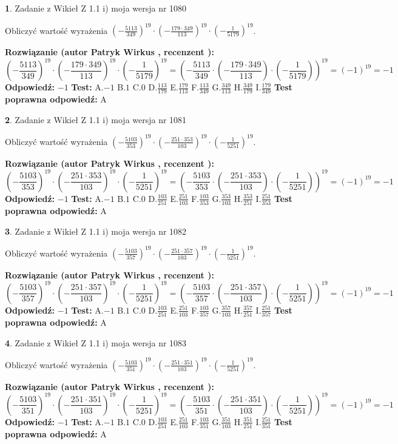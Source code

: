 \documentclass[12pt, a4paper]{article}
\theoremstyle{definition} %
\newtheorem{zad}{}
\newcommand{\zadStart}[1]{\begin{zad}#1\newline}
\newcommand{\zadStop}{\end{zad}}
\newcommand{\rozwStart}[2]{\noindent \textbf{Rozwiązanie (autor #1 , recenzent #2): }\newline}
\newcommand{\rozwStop}{\newline}
\newcommand{\odpStart}{\noindent \textbf{Odpowiedź:}\newline}
\newcommand{\odpStop}{\newline}
\newcommand{\testStart}{\noindent \textbf{Test:}\newline}
\newcommand{\testStop}{\newline}
\newcommand{\kluczStart}{\noindent \textbf{Test poprawna odpowiedź:}\newline}
\newcommand{\kluczStop}{\newline}
\begin{document}
\zadStart{Zadanie z Wikieł Z 1.1 i) moja wersja nr 1080}

Obliczyć wartość wyrażenia $(-\frac{5113}{349})^{19} \cdot (-\frac{179 \cdot 349}{113})^{19} \cdot (-\frac{1}{5179})^{19}$.
\zadStop
\rozwStart{Patryk Wirkus}{}
$$(-\frac{5113}{349})^{19} \cdot (-\frac{179 \cdot 349}{113})^{19} \cdot (-\frac{1}{5179})^{19} = (-\frac{5113}{349} \cdot (-\frac{179 \cdot 349}{113}) \cdot (-\frac{1}{5179}))^{19} = (-1)^{19} = -1$$
\rozwStop
\odpStart
$-1$
\odpStop
\testStart
A.$-1$ B.$1$ C.$0$ D.$\frac{113}{179}$ E.$\frac{179}{113}$
F.$\frac{113}{349}$ G.$\frac{349}{113}$
H.$\frac{349}{179}$
I.$\frac{179}{349}$
\testStop
\kluczStart
A
\kluczStop



\zadStart{Zadanie z Wikieł Z 1.1 i) moja wersja nr 1081}

Obliczyć wartość wyrażenia $(-\frac{5103}{353})^{19} \cdot (-\frac{251 \cdot 353}{103})^{19} \cdot (-\frac{1}{5251})^{19}$.
\zadStop
\rozwStart{Patryk Wirkus}{}
$$(-\frac{5103}{353})^{19} \cdot (-\frac{251 \cdot 353}{103})^{19} \cdot (-\frac{1}{5251})^{19} = (-\frac{5103}{353} \cdot (-\frac{251 \cdot 353}{103}) \cdot (-\frac{1}{5251}))^{19} = (-1)^{19} = -1$$
\rozwStop
\odpStart
$-1$
\odpStop
\testStart
A.$-1$ B.$1$ C.$0$ D.$\frac{103}{251}$ E.$\frac{251}{103}$
F.$\frac{103}{353}$ G.$\frac{353}{103}$
H.$\frac{353}{251}$
I.$\frac{251}{353}$
\testStop
\kluczStart
A
\kluczStop



\zadStart{Zadanie z Wikieł Z 1.1 i) moja wersja nr 1082}

Obliczyć wartość wyrażenia $(-\frac{5103}{357})^{19} \cdot (-\frac{251 \cdot 357}{103})^{19} \cdot (-\frac{1}{5251})^{19}$.
\zadStop
\rozwStart{Patryk Wirkus}{}
$$(-\frac{5103}{357})^{19} \cdot (-\frac{251 \cdot 357}{103})^{19} \cdot (-\frac{1}{5251})^{19} = (-\frac{5103}{357} \cdot (-\frac{251 \cdot 357}{103}) \cdot (-\frac{1}{5251}))^{19} = (-1)^{19} = -1$$
\rozwStop
\odpStart
$-1$
\odpStop
\testStart
A.$-1$ B.$1$ C.$0$ D.$\frac{103}{251}$ E.$\frac{251}{103}$
F.$\frac{103}{357}$ G.$\frac{357}{103}$
H.$\frac{357}{251}$
I.$\frac{251}{357}$
\testStop
\kluczStart
A
\kluczStop



\zadStart{Zadanie z Wikieł Z 1.1 i) moja wersja nr 1083}

Obliczyć wartość wyrażenia $(-\frac{5103}{351})^{19} \cdot (-\frac{251 \cdot 351}{103})^{19} \cdot (-\frac{1}{5251})^{19}$.
\zadStop
\rozwStart{Patryk Wirkus}{}
$$(-\frac{5103}{351})^{19} \cdot (-\frac{251 \cdot 351}{103})^{19} \cdot (-\frac{1}{5251})^{19} = (-\frac{5103}{351} \cdot (-\frac{251 \cdot 351}{103}) \cdot (-\frac{1}{5251}))^{19} = (-1)^{19} = -1$$
\rozwStop
\odpStart
$-1$
\odpStop
\testStart
A.$-1$ B.$1$ C.$0$ D.$\frac{103}{251}$ E.$\frac{251}{103}$
F.$\frac{103}{351}$ G.$\frac{351}{103}$
H.$\frac{351}{251}$
I.$\frac{251}{351}$
\testStop
\kluczStart
A
\kluczStop
\end{document}
